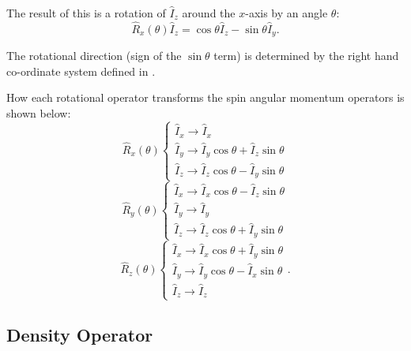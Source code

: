 The result of this is a rotation of $\hat{I}_z$ around the $x$-axis by an angle $\theta$:
\begin{equation}
  \hat{R}_x(\theta)\hat{I}_z = \cos{\theta}\hat{I}_z - \sin{\theta}\hat{I}_y.
\end{equation}

The rotational direction (sign of the $\sin{\theta}$ term) is determined by the right hand co-ordinate system defined in .

How each rotational operator transforms the spin angular momentum operators is shown
below:
\begin{equation}
  \hat{R}_x(\theta) \begin{cases}
    \hat{I}_x \rightarrow \hat{I}_x \\
    \hat{I}_y \rightarrow \hat{I}_y\cos\theta + \hat{I}_z\sin\theta \\
    \hat{I}_z \rightarrow \hat{I}_z\cos\theta - \hat{I}_y\sin\theta
\end{cases}
\end{equation}
\begin{equation}
  \hat{R}_y(\theta) \begin{cases}
    \hat{I}_x \rightarrow \hat{I}_x\cos\theta - \hat{I}_z\sin\theta \\
    \hat{I}_y \rightarrow \hat{I}_y \\
    \hat{I}_z \rightarrow \hat{I}_z\cos\theta + \hat{I}_y\sin\theta
\end{cases}
\end{equation}
\begin{equation}
  \hat{R}_z(\theta) \begin{cases}
    \hat{I}_x \rightarrow \hat{I}_x\cos\theta + \hat{I}_y\sin\theta \\
    \hat{I}_y \rightarrow \hat{I}_y\cos\theta - \hat{I}_x\sin\theta \\
    \hat{I}_z \rightarrow \hat{I}_z
\end{cases}.
\end{equation}


\subsection{Density Operator}\label{Density}

